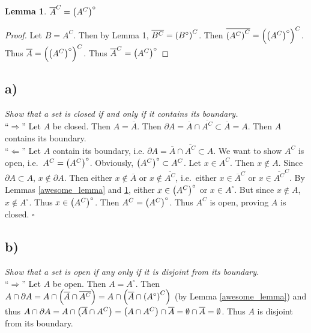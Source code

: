 \documentclass[12pt]{article}
\theoremstyle{plain}
\newtheorem{lemma}{Lemma}
\begin{document}
\begin{lemma}
    \label{second_awesome_lemma}
    $\overline{A}^C = \qty(A^C)^\circ$
\end{lemma}
\begin{proof}
    Let $B = A^C$.  Then by Lemma 1, $\overline{B^C} = \qty(B^\circ)^C$.  Then $\overline{\qty(A^C)^C} = \qty(\qty(A^C)^\circ)^C$.  Thus $\overline{A} = \qty(\qty(A^C)^\circ)^C$.  Thus $\overline{A}^C = \qty(A^C)^\circ$
\end{proof}

\subsection*{ a)}
\emph{Show that a set is closed if and only if it contains its boundary.} \\

\noindent``$\Longrightarrow$''  Let $A$ be closed.  Then $A = \overline{A}$.  Then $\partial A = \overline{A} \cap \overline{A^C} \subset \overline{A} = A$.  Then $A$ contains its boundary. \\

\noindent``$\Longleftarrow$''  Let $A$ contain its boundary, i.e. $\partial A = \overline{A} \cap \overline{A^C} \subset A$.  We want to show $A^C$ is open, i.e.~$A^C = \qty(A^C)^\circ$.  Obviously, $\qty(A^C)^\circ \subset A^C$.  Let $x \in A^C$.  Then $x \not\in A$.  Since $\partial A \subset A$, $x \not\in \partial A$.  Then either $x \not\in \overline{A}$ or $x \not\in \overline{A^C}$, i.e.~either $x \in \overline{A}^C$ or $x \in \overline{A^C}^C$.  By Lemmas \ref{awesome_lemma} and \ref{second_awesome_lemma}, either $x \in \qty(A^C)^\circ$ or $x \in A^\circ$.  But since $x \not\in A$, $x \not\in A^\circ$.  Thus $x \in \qty(A^C)^\circ$.  Then $A^C = \qty(A^C)^\circ$.  Thus $A^C$ is open, proving $A$ is closed. \hfill $\square$

\subsection*{ b)}
\emph{Show that a set is open if any only if it is disjoint from its boundary.}\\

\noindent``$\Longrightarrow$''  Let $A$ be open.  Then $A = A^\circ$.  Then $A \cap \partial A = A \cap \qty(\overline{A} \cap \overline{A^C}) = A \cap \qty(\overline{A} \cap \qty(A^\circ)^C)$ (by Lemma \ref{awesome_lemma}) and thus $A \cap \partial A = A \cap \qty(\overline{A} \cap A^C) = \qty(A \cap A^C) \cap \overline{A} = \emptyset \cap \overline{A} = \emptyset$.  Thus $A$ is disjoint from its boundary. \\
\end{document}
